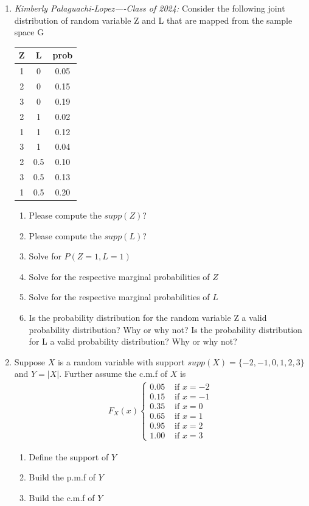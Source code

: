 \begin{enumerate}
    \item \textit{Kimberly Palaguachi-Lopez—-Class of 2024:} Consider the following joint distribution of random variable Z and L that are mapped from the sample space G 
     \begin{table}[ht!]
    \centering
    \begin{tabular}{c c | c}
        Z & L & prob \\
        \hline
        1 & 0   & 0.05\\
        2 & 0   & 0.15\\
        3 & 0   & 0.19\\
        2 & 1   & 0.02\\
        1 & 1   & 0.12\\
        3 & 1   & 0.04\\
        2 & 0.5 & 0.10\\
        3 & 0.5 & 0.13\\
        1 & 0.5 & 0.20
    \end{tabular}
    \end{table}
    \begin{enumerate}
        \item Please compute the $supp(Z)$?
        \item Please compute the $supp(L)$?
        \item Solve for $P(Z=1,L=1)$ 
        \item Solve for the respective marginal probabilities of $Z$ 
        \item Solve for the respective marginal probabilities of $L$
        \item Is the probability distribution for the random variable Z a valid probability distribution? Why or why not? Is the probability distribution for L a valid probability distribution? Why or why not? 
    \end{enumerate}

    \item Suppose $X$ is a random variable with support $supp(X) = \{-2,-1,0,1,2,3\}$ and $Y = |X|$. Further assume the c.m.f of $X$ is 
    \begin{align}
        F_{X}(x) \begin{cases}
                     0.05 & \text{ if } x=-2\\
                     0.15 & \text{ if } x=-1\\
                     0.35 & \text{ if } x=0\\
                     0.65 & \text{ if } x=1\\
                     0.95 & \text{ if } x=2\\
                     1.00 & \text{ if } x=3
                  \end{cases}
    \end{align}
    \begin{enumerate}
            \item Define the support of $Y$
        \item Build the p.m.f of $Y$
        \item Build the c.m.f of $Y$
    \end{enumerate}
    

\end{enumerate}

